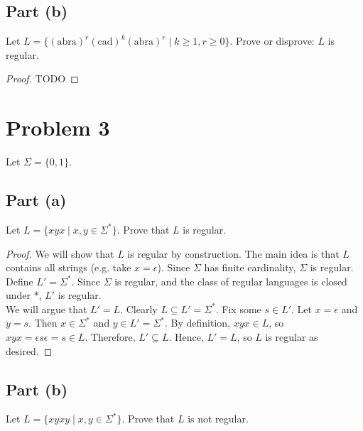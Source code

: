 \documentclass{article}
\begin{document}
\subsection*{Part (b)}

Let $L = \{ (\text{abra})^r (\text{cad})^k (\text{abra})^r \mid k \geq 1, r \geq 0 \}$. Prove or disprove: $L$ is regular.

\begin{proof}
    TODO
\end{proof}

\section*{Problem 3}

Let $\Sigma = \{ 0, 1 \}$.

\subsection*{Part (a)}

Let $L = \{ xyx \mid x, y \in \Sigma^* \}$. Prove that $L$ is regular.

\begin{proof}
    We will show that $L$ is regular by construction. The main idea is that $L$ contains all strings (e.g. take $x = \epsilon$). Since $\Sigma$ has finite 
    cardinality, $\Sigma$ is regular. Define $L' = \Sigma^*$. Since $\Sigma$ is regular, and the class of regular languages is closed under $*$, $L'$ is 
    regular. \\
    
    \noindent
    We will argue that $L' = L$. Clearly $L \subseteq L' = \Sigma^*$. Fix some $s \in L'$. Let $x = \epsilon$ and $y = s$. Then $x \in \Sigma^*$ and 
    $y \in L' = \Sigma^*$. By definition, $xyx \in L$, so $xyx = \epsilon s \epsilon = s \in L$. Therefore, $L' \subseteq L$. Hence, $L' = L$, so $L$ is regular 
    as desired.
\end{proof}

\subsection*{Part (b)}

Let $L = \{ xyxy \mid x, y \in \Sigma^* \}$. Prove that $L$ is not regular. 
\end{document}
